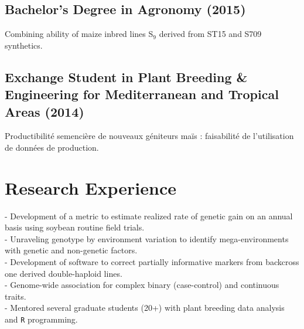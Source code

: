 \documentclass[]{mdkrause_cv_openfont}
\begin{document}
\begin{minipage}[t]{1\textwidth}
\sectionsep

\subsection{Bachelor's Degree in Agronomy (2015)}
 Combining ability of maize inbred lines S$_9$ derived from ST15 and S709 synthetics.

\sectionsep

\subsection{Exchange Student in Plant Breeding \& Engineering for Mediterranean and Tropical Areas (2014)}
 Productibilité semencière de nouveaux géniteurs maïs : faisabilité de l’utilisation de données de production.

\sectionsep


\section{Research Experience}

\sectionsep

- Development of a metric to estimate realized rate of genetic gain on an annual basis using soybean routine field trials. \\
- Unraveling genotype by environment variation to identify mega-environments with genetic and non-genetic factors. \\
- Development of software to correct partially informative markers from backcross one derived double-haploid lines. \\
- Genome-wide association for complex binary (case-control) and continuous traits. \\
- Mentored several graduate students (20+) with plant breeding data analysis and \texttt{R} programming. 


\end{minipage}
\end{document}
